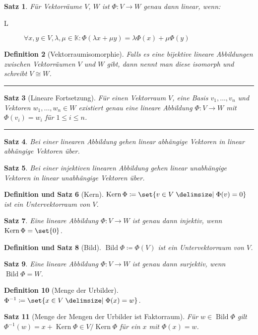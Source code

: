 \documentclass[a4paper]{article}
\newcounter{Sec}
\theoremstyle{marginbreak}
\newtheorem{definition}{Definition}[Sec]
\newtheorem{satz}[definition]{Satz}
\newtheorem{defsatz}[definition]{Definition und Satz}
\DeclareMathOperator{\Kern}{Kern}
\DeclareMathOperator{\Bild}{Bild}
\newcommand{\sep}{%
	\rule{\textwidth}{0.3pt}%
	\stepcounter{Sec}%
	}
\begin{document}
	\begin{satz}
		Für Vektorräume $V$, $W$ ist $\Phi\colon V\to W$ genau dann linear, wenn:
		\begin{description}
			\item[L] $\forall x, y\in V, \lambda, \mu\in\mathbb{K}: \Phi(\lambda x + \mu y) = \lambda\Phi(x) + \mu\Phi(y)$
		\end{description}
	\end{satz}
	\begin{definition}[Vektorraumisomorphie]
		Falls es eine bijektive lineare Abbildungen zwischen Vektorräumen $V$ und $W$
		gibt, dann nennt man diese isomorph und schreibt $V \cong W$.
	\end{definition}
	\sep
	\begin{satz}[Lineare Fortsetzung]
		Für einen Vektorraum $V$, eine Basis ${v_1,\ldots,v_n}$ und Vektoren
		$w_1,\ldots,w_n \in W$ existiert genau eine lineare Abbildung $\Phi\colon V\to W$
		mit $\Phi(v_i) = w_i$ für $ 1 \leq i \leq n$.
	\end{satz}
	\sep
	\begin{satz}
		Bei einer linearen Abbildung gehen linear abhängige Vektoren in linear
		abhängige Vektoren über.
	\end{satz}
	\begin{satz}
		Bei einer injektiven linearen Abbildung gehen linear unabhängige Vektoren in
		linear unabhängige Vektoren über.
	\end{satz}
	\begin{defsatz}[Kern]
		$\Kern\Phi\coloneqq\set{v\in V\given\Phi(v)=0}$ ist ein Untervektorraum von $V$.
	\end{defsatz}
	\begin{satz}
		Eine lineare Abbildung $\Phi\colon V\to W$ ist genau dann injektiv, wenn $\Kern\Phi = \set{0}$.
	\end{satz}
	\begin{defsatz}[Bild]
		$\Bild\Phi\coloneqq\Phi(V)$ ist ein Untervektorraum von $V$.
	\end{defsatz}
	\begin{satz}
		Eine lineare Abbildung $\Phi\colon V\to W$ ist genau dann surjektiv, wenn $\Bild\Phi = W$.
	\end{satz}
	\begin{definition}[Menge der Urbilder]
		$\Phi^{-1}\coloneqq\set{x\in V\given\Phi(x)=w}$.
	\end{definition}
	\begin{satz}[Menge der Mengen der Urbilder ist Faktorraum]
		Für $w\in\Bild\Phi$ gilt $\Phi^{-1}(w) = x + \Kern\Phi \in V/\Kern\Phi$
		für ein $x$ mit $\Phi(x) = w$.
	\end{satz}
\end{document}
